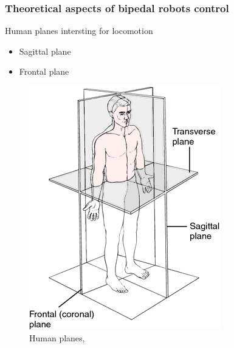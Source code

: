 \documentclass{beamer}
\begin{document}
	\begin{frame}
		\frametitle{Theoretical aspects of bipedal robots control}
		\begin{block}{Human planes intersting for locomotion}
			\begin{itemize}
				\item
					Sagittal plane
				\item
					Frontal plane
					
			\end{itemize}
		\end{block}
		
		\begin{figure}[h!]
			\begin{minipage}[H]{\linewidth}
				\centering
				\includegraphics[width=0.3\linewidth]{presentation_images/12}
				\caption{Human planes, \cite{medical}}
			\end{minipage}
		\end{figure}
	\end{frame}
	
\end{document}
